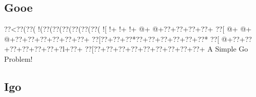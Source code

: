 \documentclass{article}
\begin{document}
\begin{center}
\section*{Gooe}
{\goo
\0??<\0??(\0??(\- !(\0??(\0??(\0??(\0??(\0??(\0??(
\- ![\- !+\- !+\- !+\- @+\- @+\0??+\0??+\0??+\0??+
\0??[\- @+\- @+\- @+\0??+\0??+\0??+\0??+\0??+\0??+
\0??[\0??+\0??+\0??*\0??+\0??+\0??+\0??+\0??+\0??*
\0??[\- @+\0??+\0??+\0??+\0??+\0??+\0??+\0?l+\0??+
\0??[\0??+\0??+\0??+\0??+\0??+\0??+\0??+\0??+\0??+
}
A Simple Go Problem!
\end{center}

\begin{center}
\section*{Igo}
\end{center}
\end{document}
